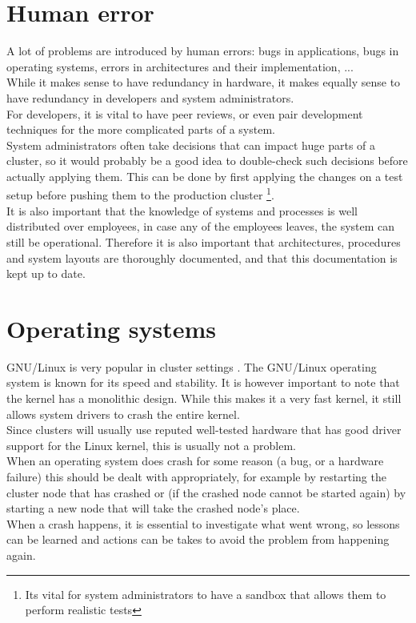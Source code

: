 \documentclass[12pt]{report}
\begin{document}
\section{Human error}
A lot of problems are introduced by human errors: bugs in
applications, bugs in operating systems, errors in architectures and
their implementation, ...\\
While it makes sense to have redundancy in hardware, it makes equally
sense to have redundancy in developers and system administrators.\\
For developers, it is vital to have peer reviews, or even pair
development techniques for the more complicated parts of a system.\\
System administrators often take decisions that can impact huge parts
of a cluster, so it would probably be a good idea to double-check such
decisions before actually applying them. This can be done by first
applying the changes on a test setup before pushing them to the
production cluster \footnote{Its vital for system administrators to
  have a sandbox that allows them to perform realistic tests}.\\
It is also important that the knowledge of systems and processes is
well distributed over employees, in case any of the employees leaves,
the system can still be operational. Therefore it is also important
that architectures, procedures and system layouts are thoroughly
documented, and that this documentation is kept up to date. 

\section{Operating systems}
GNU/Linux is very popular in cluster settings
\cite{server_market_share}.
The GNU/Linux operating system is known for its speed and stability.
It is however important to note that the kernel has a monolithic
design. While this makes it a very fast kernel, it still allows system drivers
to crash the entire kernel. \\
Since clusters will usually use reputed well-tested hardware that has
good driver support for the Linux kernel, this is usually not  a
problem.\\
When an operating system does crash for some reason (a bug, or a
hardware failure) this should be dealt with appropriately, for example
by restarting the cluster node that has crashed or (if the crashed
node cannot be started again) by starting a new node that will take
the crashed node's place.\\
When a crash happens, it is essential to investigate what went wrong,
so lessons can be learned and actions can be takes to avoid the
problem from happening again.
\end{document}
